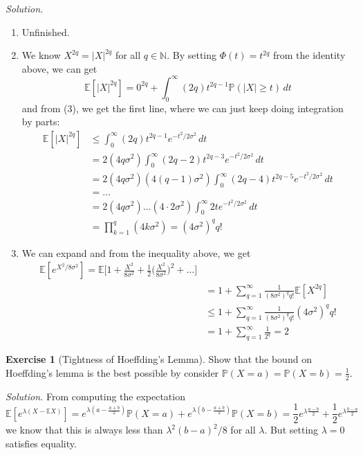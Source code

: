\documentclass{article}
\theoremstyle{definition}
\newtheorem{exercise}{Exercise}[section]
\theoremstyle{remark}
\theoremstyle{definition}
\newenvironment{solution}{\noindent \textit{Solution.}}{}
\begin{document}
\begin{solution}
\begin{enumerate}
    \item Unfinished. 
    
    \item We know $X^{2q} = |X|^{2q}$ for all $q \in \mathbb{N}$. By setting $\Phi(t) = t^{2q}$ from the identity above, we can get 
    \[\mathbb{E}[|X|^{2q}] = 0^{2q} + \int_0^\infty (2q) t^{2q - 1} \mathbb{P}(|X| \geq t) \,dt\]
    and from (3), we get the first line, where we can just keep doing integration by parts: 
    \begin{align*}
        \mathbb{E}[|X|^{2q}] & \leq \int_0^\infty (2q) t^{2q - 1} e^{- t^2 / 2 \sigma^2} \,dt \\
        & = 2 (4q \sigma^2) \int_0^\infty (2q - 2) t^{2q - 3} e^{-t^2 / 2 \sigma^2} \, dt \\
        & = 2 (4q \sigma^2) (4 (q - 1) \sigma^2) \int_0^\infty (2q - 4) t^{2q - 5} e^{-t^2 / 2\sigma^2} \,dt \\
        & = \ldots \\
        & = 2 (4q \sigma^2) \ldots (4 \cdot 2\sigma^2) \int_0^\infty 2t e^{-t^2 / 2 \sigma^2} \,dt \\
        & = \prod_{k=1}^q (4 k \sigma^2) = (4 \sigma^2)^q q! 
    \end{align*}
    
    \item We can expand and from the inequality above, we get 
    \begin{align*}
        \mathbb{E}[e^{X^2 / 8 \sigma^2}] = \mathbb{E} \bigg[ 1 + \frac{X^2}{8 \sigma^2} + \frac{1}{2} \bigg( \frac{X^2}{8 \sigma^2}\bigg)^2 + \ldots \bigg] \\
        & = 1 + \sum_{q = 1}^\infty \frac{1}{(8 \sigma^2)^q q!} \mathbb{E}[X^{2q}] \\
        & \leq 1 + \sum_{q = 1}^\infty \frac{1}{(8 \sigma^2)^q q!} (4 \sigma^2)^q q! \\
        & = 1 + \sum_{q=1}^\infty \frac{1}{2^q} = 2 
    \end{align*}
\end{enumerate}


\end{solution}

\begin{exercise}[Tightness of Hoeffding's Lemma]
Show that the bound on Hoeffding's lemma is the best possible by consider $\mathbb{P}(X = a) = \mathbb{P}(X = b) = \frac{1}{2}$. 
\end{exercise}
\begin{solution}
From computing the expectation 
\[\mathbb{E}[ e^{\lambda (X - \mathbb{E} X)}] = e^{\lambda (a - \frac{a + b}{2})} \mathbb{P}(X = a) + e^{\lambda (b - \frac{a + b}{2})} \mathbb{P}(X = b) = \frac{1}{2} e^{ \lambda \frac{a - b}{2}} + \frac{1}{2} e^{\lambda \frac{b - a}{2}}\]
we know that this is always less than $\lambda^2 (b - a)^2/ 8$ for all $\lambda$. But setting $\lambda = 0$ satisfies equality. 
\end{solution}
\end{document}
